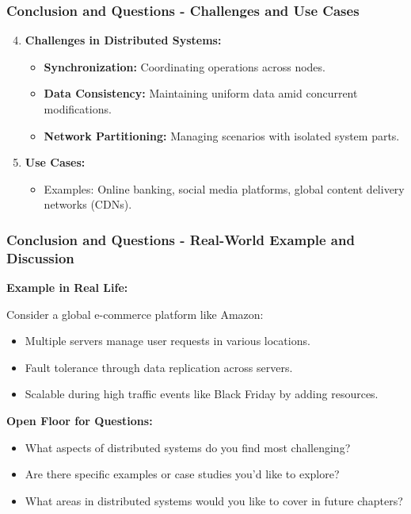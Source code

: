 \documentclass[aspectratio=169]{beamer}
\begin{document}
\begin{frame}[fragile]
  \frametitle{Conclusion and Questions - Challenges and Use Cases}
  \begin{enumerate}
    \setcounter{enumi}{3}
    \item \textbf{Challenges in Distributed Systems:}
    \begin{itemize}
      \item \textbf{Synchronization:} Coordinating operations across nodes.
      \item \textbf{Data Consistency:} Maintaining uniform data amid concurrent modifications.
      \item \textbf{Network Partitioning:} Managing scenarios with isolated system parts.
    \end{itemize}

    \item \textbf{Use Cases:}
    \begin{itemize}
      \item Examples: Online banking, social media platforms, global content delivery networks (CDNs).
    \end{itemize}
  \end{enumerate}
\end{frame}

\begin{frame}[fragile]
  \frametitle{Conclusion and Questions - Real-World Example and Discussion}
  \textbf{Example in Real Life:}

  Consider a global e-commerce platform like Amazon:
  \begin{itemize}
    \item Multiple servers manage user requests in various locations.
    \item Fault tolerance through data replication across servers.
    \item Scalable during high traffic events like Black Friday by adding resources.
  \end{itemize}

  \textbf{Open Floor for Questions:}
  \begin{itemize}
    \item What aspects of distributed systems do you find most challenging?
    \item Are there specific examples or case studies you’d like to explore?
    \item What areas in distributed systems would you like to cover in future chapters?
  \end{itemize}
\end{frame}
\end{document}
